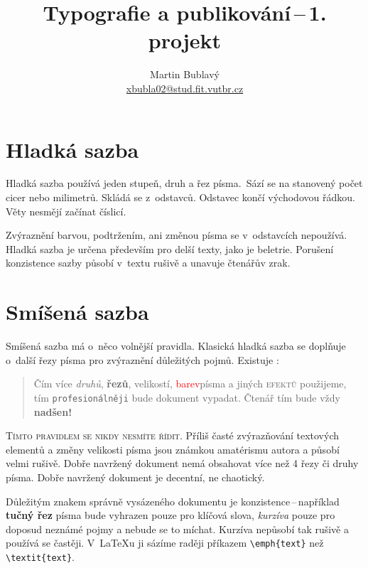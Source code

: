 \documentclass[a4paper, 10pt, twocolumn]{article}
\title{Typografie a publikování\,--\,1. projekt}
\author{Martin Bublavý \\ \href{mailto:xbubla02@stud.fit.vutbr.cz}{xbubla02@stud.fit.vutbr.cz}}
\date{}
\begin{document}
\maketitle

\section{Hladká sazba}

Hladká sazba používá jeden stupeň, druh a řez písma.~Sází se na stanovený počet cicer nebo milimetrů. Skládá se z~od\-stav\-ců. Odstavec končí východovou řádkou. Věty nesmějí začínat číslicí.

Zvýraznění barvou, podtržením, ani změnou písma se v~odstavcích nepoužívá. Hladká sazba je určena především pro delší texty, jako je beletrie. Porušení konzistence sazby působí v~textu rušivě a unavuje čtenářův zrak.

\section{Smíšená sazba}

Smíšená sazba má o~něco volnější pravidla. Klasická hladká sazba se doplňuje o~další řezy písma pro zvýraznění důležitých pojmů. Existuje :

\begin{quotation}
Čím více \emph{druhů}, \textbf{řezů}, {\tiny velikostí}, \textcolor{red}{barev}\linebreak písma a jiných \textsc{efektů} použijeme, tím \texttt{profesionálněji} bude {\Large {}\selectfont dokument} vypadat.
{\huge Č}{\LARGE t}{\Large e}{\large n}{\normalsize á}{\small ř} {\footnotesize t}{\scriptsize í}{\tiny m} bude vždy \textbf{\Huge nadšen!}
\end{quotation}

\textsc{Tímto pravidlem se nikdy nesmíte řídit.} Příliš časté zvýrazňování textových elementů a změny velikosti písma jsou známkou amatérismu autora a působí velmi rušivě.
Dobře navržený dokument nemá obsahovat více než 4 řezy či druhy písma.
Dobře navržený dokument je decentní, ne chaotický.

Důležitým znakem správně vysázeného dokumentu je konzistence\,--\,například \textbf{tučný řez} písma bude vyhrazen pouze pro klíčová slova, \emph{kurzíva} pouze pro doposud neznámé pojmy a nebude se to míchat.
Kurzíva nepůsobí tak rušivě a používá se častěji.
V~\LaTeX u ji sázíme raději příkazem \verb+\emph{text}+ než \verb+\textit{text}+.
\end{document}
